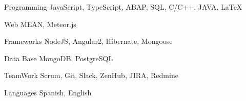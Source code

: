


\begin{cvskills}


\cvskill
{Programming} %
{JavaScript, TypeScript, ABAP, SQL, C/C++, JAVA, \LaTeX{}} %


\cvskill
{Web} %
{MEAN,  Meteor.js} %

\cvskill
{Frameworks} %
{NodeJS, Angular2, Hibernate, Mongoose} %

\cvskill
{Data Base} %
{MongoDB, PostgreSQL} %

\cvskill
{TeamWork} %
{Scrum, Git, Slack, ZenHub, JIRA, Redmine} %

\cvskill
{Languages} %
{Spanish, English} %


\end{cvskills}
